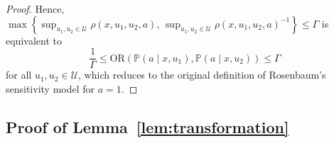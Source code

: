 \documentclass{article} %
\theoremstyle{definition}
\theoremstyle{plain}
\begin{document}
\begin{proof}
Hence, $\max\left\{\sup_{u_1, u_2 \in \mathcal{U}} \rho(x, u_1, u_2, a), \, \sup_{u_1, u_2 \in \mathcal{U}} \rho(x, u_1, u_2, a)^{-1} \right\} \leq \Gamma$ is equivalent to 
\begin{equation}
    \frac{1}{\Gamma} \leq \mathrm{OR}\left(\mathbb{P}(a \mid x, u_1), \mathbb{P}(a \mid x, u_2)\right)\leq \Gamma
\end{equation}
for all $u_1, u_2 \in \mathcal{U}$, which reduces to the original definition of Rosenbaum's sensitivity model for $a=1$.
\end{proof}

\subsection{Proof of Lemma~\ref{lem:transformation}}
\end{document}
